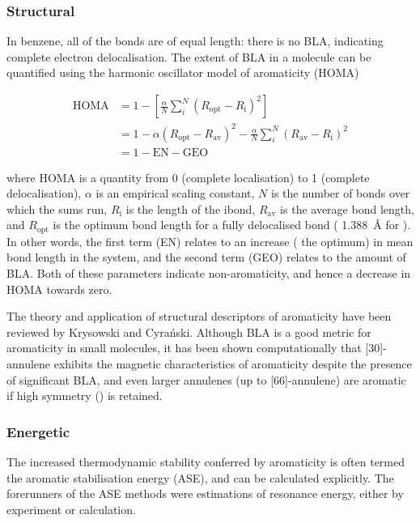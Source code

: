 		
		\subsubsection{Structural}

			In benzene, all of the  bonds are of equal length: there is no BLA, indicating complete electron delocalisation. The extent of BLA in a molecule can be quantified using the harmonic oscillator model of aromaticity (HOMA)\autocite{Kruszewski1972}

			\begin{align}
				\text{HOMA} &= 1 - \left[\frac{\alpha}{N} \sum_i^N ( R_\text{opt} - R_\text{i})^2\right] \\
				&= 1 - \alpha (R_\text{opt} - R_\text{av})^2 - \frac{\alpha}{N} \sum_i^N( R_\text{av} - R_\text{i})^2 \\
				&= 1 - \text{EN} - \text{GEO}
			\end{align}

			\noindent{}where HOMA is a quantity from 0 (complete localisation) to 1 (complete delocalisation), $\alpha$ is an empirical scaling constant, $N$ is the number of bonds over which the sums run, $R_\text{i}$ is the length of the i\nth bond, $R_\text{av}$ is the average bond length, and $R_\text{opt}$ is the optimum bond length for a fully delocalised bond ( \SI{1.388}{\angstrom} for ).\autocite{Kruszewski1972} In other words, the first term (EN) relates to an increase ( the optimum) in mean bond length in the system, and the second term (GEO) relates to the amount of BLA\@. Both of these parameters indicate non-aromaticity, and hence a decrease in HOMA towards zero.\autocite{Krygowski2000a}

			The theory and application of structural descriptors of aromaticity have been reviewed by Krysowski and Cyra\'nski.\autocite{Krygowski2001} Although BLA is a good metric for aromaticity in small molecules, it has been shown computationally that [30]-annulene exhibits the magnetic characteristics of aromaticity despite the presence of significant BLA, and even larger annulenes (up to [66]-annulene) are aromatic if high symmetry () is retained.\autocite{Wannere2003,Choi1998}

		\subsubsection{Energetic}

			The increased thermodynamic stability conferred by aromaticity is often termed the aromatic stabilisation energy (ASE), and can be calculated explicitly. The forerunners of the ASE methods were estimations of resonance energy, either by experiment or calculation.\autocite{Gleiter2012,Cyranski2005}

